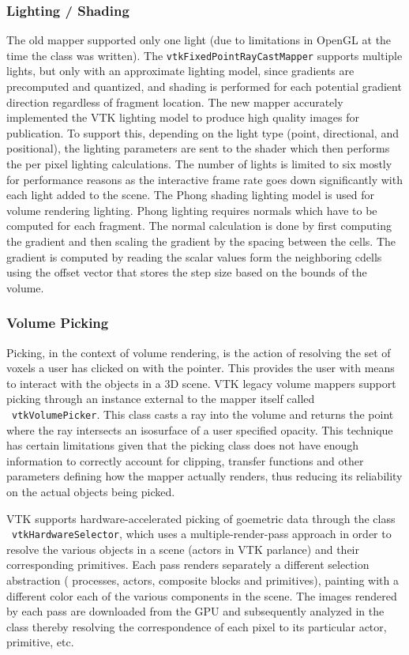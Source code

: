 \subsubsection{Lighting / Shading }
The old mapper supported only one light (due to limitations in OpenGL at the time the class was written). The \texttt{vtkFixedPointRayCastMapper} supports multiple lights, but only with an approximate lighting model, since gradients are precomputed and quantized, and shading is performed for each potential gradient direction regardless of fragment location. The new mapper accurately implemented the VTK lighting model to produce high quality images for publication. To support this, depending on the light type (point, directional, and positional), the lighting parameters are sent to the shader which then performs the per pixel lighting calculations. The number of lights is limited to six mostly for performance reasons as the interactive frame rate goes down significantly with each light added to the scene. The Phong shading lighting model is used for volume rendering lighting. Phong lighting requires normals which have to be computed for each fragment. The normal calculation is done by first computing the gradient and then scaling the gradient by the spacing between the cells. The gradient is computed by reading the scalar values form the neighboring cdells using the offset vector that stores the step size based on the bounds of the volume. 

\subsubsection{Volume Picking}
Picking, in the context of volume rendering, is the action of resolving the set of voxels a user has clicked on with the pointer. This provides the user with means to interact with the objects in a 3D scene. VTK legacy volume mappers support picking through an instance external to the mapper itself called ~\texttt{vtkVolumePicker}.  This class casts a ray into the volume and returns the point where the ray intersects an isosurface of a user specified opacity. This technique has certain limitations given that the picking class does not have enough information to correctly account for clipping, transfer functions and other parameters defining how the mapper actually renders, thus reducing its reliability on the actual objects being picked.

VTK supports hardware-accelerated picking of goemetric data through the class ~\texttt{vtkHardwareSelector}, which uses a multiple-render-pass approach in order to resolve the various objects in a scene (actors in VTK parlance) and their corresponding primitives.  Each pass renders separately a different selection abstraction ( processes, actors, composite blocks and primitives), painting with a different color each of the various components in the scene.  The images rendered by each pass are downloaded from the GPU and subsequently analyzed in the class thereby resolving the correspondence of each pixel to its particular actor, primitive, etc.

